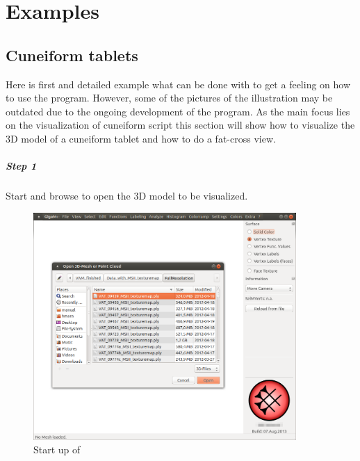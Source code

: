\chapter{Examples}\label{example}
\section{Cuneiform tablets}\label{cuneiform}
Here is first and detailed example what can be done with \GigaMesh to get a feeling on how to use the program. However,  some of the pictures of the illustration may be outdated due to the ongoing development of the program.
As the main focus lies on the visualization of cuneiform script this section will show how to visualize the 3D model of a cuneiform tablet and how to do a fat-cross view.


\paragraph*{Step 1}
Start \GigaMesh and browse to open the 3D model to be visualized. 
\begin{figure}[H]
\begin{center}
    \includegraphics[width=10cm]{figs/gigamesh_gui_startup}
    \caption{Start up of \GigaMesh}\label{fig_start}
\end{center}
\end{figure}

